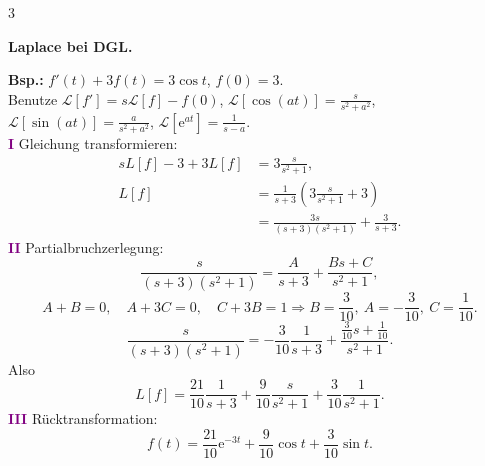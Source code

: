 \documentclass[a4paper,landscape]{article}
\newcommand{\ee}{\mathrm e}
\newcommand{\KR}[1]{\textcolor{purple}{\textbf{#1}}}
\newcommand{\themenzeile}[1]{%
  \par\smallskip
  \begingroup
  \setlength{\fboxsep}{0.7mm}%
  \noindent\colorbox{themenrahmen}{%
    \parbox{\dimexpr\linewidth-2\fboxsep\relax}{\color{white}\bfseries #1}}%
  \endgroup
  \par\nobreak\smallskip\nobreak
}
\begin{document}
\begin{multicols*}{3}
\themenzeile{Laplace bei DGL.}
\textbf{Bsp.:} $f'(t)+3f(t)=3\cos t$, $f(0)=3$.\\[-0.2mm]
Benutze $\mathcal L[f']=s\mathcal L[f]-f(0)$, $\mathcal L[\cos(at)]=\frac{s}{s^2+a^2}$, $\mathcal L[\sin(at)]=\frac{a}{s^2+a^2}$, $\mathcal L[\ee^{at}]=\frac1{s-a}$.\\[-0.2mm]
\KR{I} Gleichung transformieren:
\[
\begin{aligned}
sL[f]-3+3L[f]&=3\frac{s}{s^2+1},\\
L[f]&=\frac1{s+3}\left(3\frac{s}{s^2+1}+3\right)\\
&=\frac{3s}{(s+3)(s^2+1)}+\frac3{s+3}.
\end{aligned}
\]
\KR{II} Partialbruchzerlegung:
\[
\frac{s}{(s+3)(s^2+1)}=\frac{A}{s+3}+\frac{Bs+C}{s^2+1},
\]
\[
A+B=0,\quad A+3C=0,\quad C+3B=1
\Rightarrow B=\frac3{10},\ A=-\frac3{10},\ C=\frac1{10}.
\]
\[
\frac{s}{(s+3)(s^2+1)}=-\frac3{10}\frac1{s+3}+\frac{\frac3{10}s+\frac1{10}}{s^2+1}.
\]
Also
\[
L[f]=\frac{21}{10}\frac1{s+3}+\frac9{10}\frac{s}{s^2+1}+\frac3{10}\frac1{s^2+1}.
\]
\KR{III} Rücktransformation:
\[
f(t)=\frac{21}{10}\ee^{-3t}+\frac9{10}\cos t+\frac3{10}\sin t.
\]

\end{multicols*}
\end{document}
